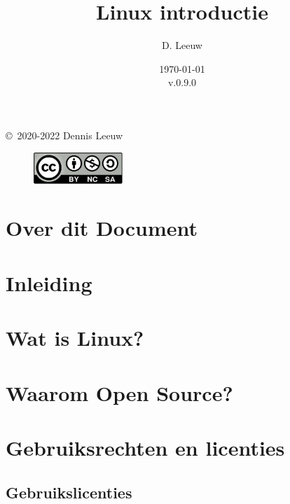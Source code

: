\documentclass[a4paper,12pt,twoside,openright,titlepage]{book}
\author{D. Leeuw}
\title{Linux introductie}
\date{\today\\v.0.9.0}
\begin{document}

\maketitle

\copyright\ 2020-2022 Dennis Leeuw\\

\begin{figure}
\includegraphics[width=0.3\textwidth]{linuxreader-img001.png}
\end{figure}

\bigskip




\frontmatter
\chapter{Over dit Document}



\tableofcontents

\mainmatter
\chapter{Inleiding}


\chapter{Wat is Linux?}


\chapter{Waarom Open Source?}


\chapter{Gebruiksrechten en licenties}

\section{Gebruikslicenties}
\end{document}
